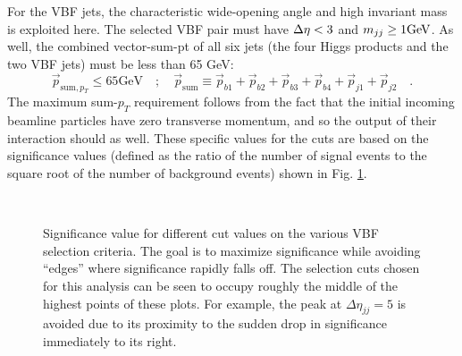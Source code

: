         For the VBF jets, the characteristic wide-opening angle and high invariant mass is exploited here.
        The selected VBF pair must have $\Delta \eta < 3$ and $m_{jj} \geq 1 \textrm{GeV}$.
        As well, the combined vector-sum-pt of all six jets
            (the four Higgs products and the two VBF jets)
            must be less than 65 GeV:
        \begin{equation}
            \vec{p}_{\textrm{sum}, p_T} \leq 65 \textrm{GeV} \quad;\quad
            \vec{p}_{\textrm{sum}} \equiv
            \vec{p}_{b1} + \vec{p}_{b2} + 
            \vec{p}_{b3} + \vec{p}_{b4} +
            \vec{p}_{j1} + \vec{p}_{j2} 
            \quad.
        \end{equation}
        The maximum sum-$p_T$ requirement follows from the fact that the initial incoming beamline particles have
            zero transverse momentum, and so the output of their interaction should as well.
        These specific values for the cuts are based on the significance values
            (defined as the ratio of the number of signal events to the square root of the number of background events)
            shown in Fig. \ref{fig:vbf_cuts}.

        \begin{figure}[tbh]
            \\
            \caption{
                Significance value for different cut values on the various VBF selection criteria\cite{vbf_hh_4b_2018_int}.
                The goal is to maximize significance while avoiding ``edges'' where significance rapidly falls off.
                The selection cuts chosen for this analysis can be seen to occupy roughly the middle
                    of the highest points of these plots.
                For example, the peak at $\Delta \eta_{jj} = 5$ is avoided due to its proximity
                    to the sudden drop in significance immediately to its right.
            }
            \label{fig:vbf_cuts}
        \end{figure}
        \FloatBarrier


